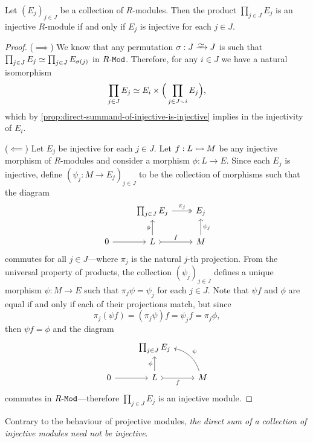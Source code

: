 \begin{proposition}
\label{prop:module-product-injective-iff-collection-injective}
Let \((E_j)_{j \in J}\) be a collection of \(R\)-modules. Then the product
\(\prod_{j \in J} E_j\) is an injective \(R\)-module if and only if \(E_j\) is
injective for each \(j \in J\).
\end{proposition}

\begin{proof}
(\(\implies\)) We know that any permutation \(\sigma: J \isoto J\) is such that
\(\prod_{j \in J} E_j \simeq \prod_{j \in J} E_{\sigma(j)}\) in \({R\text{-}\texttt{Mod}}\).
Therefore, for any \(i \in J\) we have a natural isomorphism
\[
\prod_{j \in J} E_j \simeq E_i \times \Big( \prod_{j \in J \smallsetminus i} E_j \Big),
\]
which by \cref{prop:direct-summand-of-injective-is-injective} implies in the
injectivity of \(E_i\).

(\(\impliedby\)) Let \(E_j\) be injective for each \(j \in J\). Let
\(f: L \rightarrowtail M\) be any injective morphism of \(R\)-modules and consider a
morphism \(\phi: L \to E\). Since each \(E_j\) is injective, define
\((\psi_j: M \to E_j)_{j \in J}\) to be the collection of morphisms such that
the diagram
\[
\begin{tikzcd}
&\prod_{j \in J} E_j \ar[r, two heads, "\pi_j"] & E_j
\\
0 \ar[r] &L \ar[u, "\phi"] \ar[r, tail, "f"] &M \ar[u, "\psi_j"']
\end{tikzcd}
\]
commutes for all \(j \in J\)---where \(\pi_j\) is the natural \(j\)-th
projection. From the universal property of products, the collection
\((\psi_j)_{j \in J}\) defines a unique morphism \(\psi: M \to E\) such that
\(\pi_j \psi = \psi_j\) for each \(j \in J\). Note that \(\psi f\) and \(\phi\)
are equal if and only if each of their projections match, but since
\[
\pi_j(\psi f) = (\pi_j \psi) f = \psi_j f = \pi_j \phi,
\]
then \(\psi f = \phi\) and the diagram
\[
\begin{tikzcd}
&\prod_{j \in J} E_j &
\\
0 \ar[r] &L \ar[u, "\phi"] \ar[r, tail, "f"'] &M \ar[lu, bend right, "\psi"']
\end{tikzcd}
\]
commutes in \({R\text{-}\texttt{Mod}}\)---therefore \(\prod_{j \in J} E_j\) is an injective
module.
\end{proof}

\begin{remark}
\label{rem:direct-sum-injective-modules-not-always-injective}
Contrary to the behaviour of projective modules, \emph{the direct sum of a
  collection of injective modules need not be injective}.
\end{remark}

